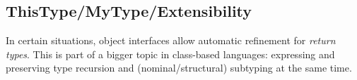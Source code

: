
% 

\subsection{ThisType/MyType/Extensibility}

In certain situations, object interfaces allow automatic refinement for \emph{return
types}. This is part of a bigger topic in class-based languages: expressing and
preserving type recursion and (nominal/structural) subtyping at the same time.

